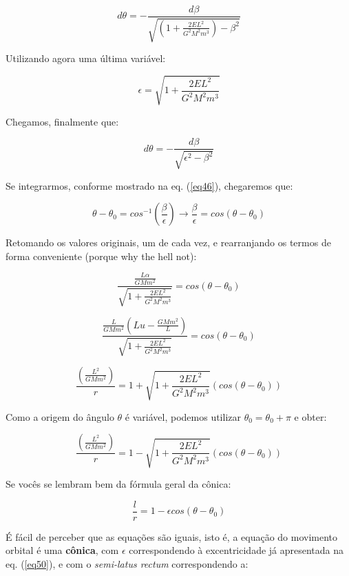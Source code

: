 \begin{equation}
	d\theta = -\frac{d\beta}{\sqrt{\left(1 + \frac{2EL^2}{G^2M^2m^3}\right) - \beta^2}}
	\label{eq49}
\end{equation}

Utilizando agora uma última variável:

\begin{equation}
	\epsilon = \sqrt{1 + \frac{2EL^2}{G^2M^2m^3}}
	\label{eq50}
\end{equation}

Chegamos, finalmente que:

\begin{equation}
	d\theta = -\frac{d\beta}{\sqrt{\epsilon^2 - \beta^2}} \label{eq51}
\end{equation}

Se integrarmos, conforme mostrado na eq. (\ref{eq46}), chegaremos que:

\begin{equation}
	\theta - \theta_0 = cos^{-1}\left(\frac{\beta}{\epsilon}\right) \rightarrow \frac{\beta}{\epsilon} = cos(\theta - \theta_0)
	\label{eq52}
\end{equation}

Retomando os valores originais, um de cada vez, e rearranjando os termos de forma conveniente (porque why the hell not):

\[
	\frac{\frac{L\alpha}{GMm^2}}{\sqrt{1 + \frac{2EL^2}{G^2M^2m^3}}} =  cos(\theta - \theta_0)
\]

\[
	\frac{\frac{L}{GMm^2}\left(Lu-\frac{GMm^2}{L}\right)}{\sqrt{1 + \frac{2EL^2}{G^2M^2m^3}}} =  cos(\theta - \theta_0)
\]

\[
	\frac{\left(\frac{L^2}{GMm^2}\right)}{r} = 1 + \sqrt{1 + \frac{2EL^2}{G^2M^2m^3}}(cos(\theta - \theta_0))
\]

Como a origem do ângulo $\theta$ é variável, podemos utilizar $\theta_0 = \theta_0 + \pi$ e obter:

\begin{equation}
	\frac{\left(\frac{L^2}{GMm^2}\right)}{r} = 1 - \sqrt{1 + \frac{2EL^2}{G^2M^2m^3}}(cos(\theta - \theta_0))
	\label{eq53}
\end{equation}

Se vocês se lembram bem da fórmula geral da cônica:

\[
	\frac{l}{r} = 1-\epsilon cos(\theta - \theta_0)
\] 

É fácil de perceber que as equações são iguais, isto é, a equação do movimento orbital é uma \textbf{cônica}, com $\epsilon$ correspondendo à excentricidade já apresentada na eq. (\ref{eq50}), e com o \textit{semi-latus rectum} correspondendo a:

